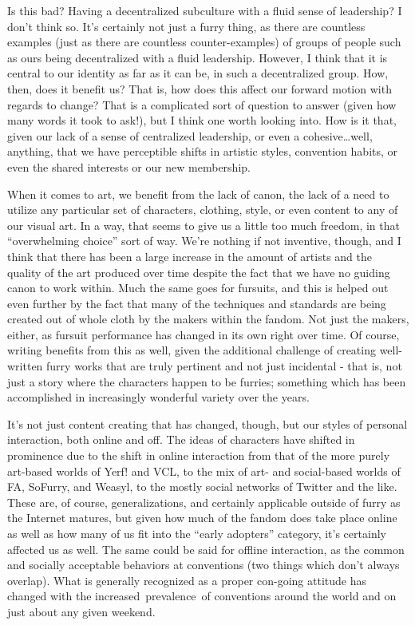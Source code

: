 Is this bad? Having a decentralized subculture with a fluid sense of
leadership? I don't think so. It's certainly not just a furry thing, as
there are countless examples (just as there are countless
counter-examples) of groups of people such as ours being decentralized
with a fluid leadership. However, I think that it is central to our
identity as far as it can be, in such a decentralized group. How, then,
does it benefit us? That is, how does this affect our forward motion
with regards to change? That is a complicated sort of question to answer
(given how many words it took to ask!), but I think one worth looking
into. How is it that, given our lack of a sense of centralized
leadership, or even a cohesive\ldots{}well, anything, that we have
perceptible shifts in artistic styles, convention habits, or even the
shared interests or our new membership.

When it comes to art, we benefit from the lack of canon, the lack of a
need to utilize any particular set of characters, clothing, style, or
even content to any of our visual art. In a way, that seems to give us a
little too much freedom, in that ``overwhelming choice'' sort of way.
We're nothing if not inventive, though, and I think that there has been
a large increase in the amount of artists and the quality of the art
produced over time despite the fact that we have no guiding canon to
work within. Much the same goes for fursuits, and this is helped out
even further by the fact that many of the techniques and standards are
being created out of whole cloth by the makers within the fandom. Not
just the makers, either, as fursuit performance has changed in its own
right over time. Of course, writing benefits from this as well, given
the additional challenge of creating well-written furry works that are
truly pertinent and not just incidental - that is, not just a story
where the characters happen to be furries; something which has been
accomplished in increasingly wonderful variety over the years.

It's not just content creating that has changed, though, but our styles
of personal interaction, both online and off. The ideas of characters
have shifted in prominence due to the shift in online interaction from
that of the more purely art-based worlds of Yerf! and VCL, to the mix of
art- and social-based worlds of FA, SoFurry, and Weasyl, to the mostly
social networks of Twitter and the like. These are, of course,
generalizations, and certainly applicable outside of furry as the
Internet matures, but given how much of the fandom does take place
online as well as how many of us fit into the ``early adopters''
category, it's certainly affected us as well. The same could be said for
offline interaction, as the common and socially acceptable behaviors at
conventions (two things which don't always overlap). What is generally
recognized as a proper con-going attitude has changed with the
increased~prevalence~of conventions around the world and on just about
any given weekend.

